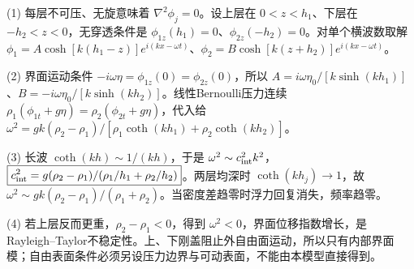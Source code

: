 (1) 每层不可压、无旋意味着 \(\nabla^2\phi_j=0\)。设上层在 \(0<z<h_1\)、下层在 \(-h_2<z<0\)，无穿透条件是 \(\phi_{1z}(h_1)=0\)、\(\phi_{2z}(-h_2)=0\)。对单个横波数取解 \(\phi_1=A\cosh[k(h_1-z)]e^{i(kx-\omega t)}\)、\(\phi_2=B\cosh[k(z+h_2)]e^{i(kx-\omega t)}\)。

(2) 界面运动条件 \(-i\omega\eta=\phi_{1z}(0)=\phi_{2z}(0)\)，所以 \(A=i\omega\eta_0/[k\sinh(kh_1)]\)、\(B=-i\omega\eta_0/[k\sinh(kh_2)]\)。线性Bernoulli压力连续 \(\rho_1(\phi_{1t}+g\eta)=\rho_2(\phi_{2t}+g\eta)\)，代入给 \(\boxed{\omega^2=gk(\rho_2-\rho_1)/[\rho_1\coth(kh_1)+\rho_2\coth(kh_2)]}\)。

(3) 长波 \(\coth(kh)\sim1/(kh)\)，于是 \(\omega^2\sim c_{\rm int}^2k^2\)，\(\boxed{c_{\rm int}^2=g(\rho_2-\rho_1)/(\rho_1/h_1+\rho_2/h_2)}\)。两层均深时 \(\coth(kh_j)\to1\)，故 \(\omega^2\sim gk(\rho_2-\rho_1)/(\rho_1+\rho_2)\)。当密度差趋零时浮力回复消失，频率趋零。

(4) 若上层反而更重，\(\rho_2-\rho_1<0\)，得到 \(\omega^2<0\)，界面位移指数增长，是Rayleigh–Taylor不稳定性。上、下刚盖阻止外自由面运动，所以只有内部界面模；自由表面条件必须另设压力边界与可动表面，不能由本模型直接得到。
